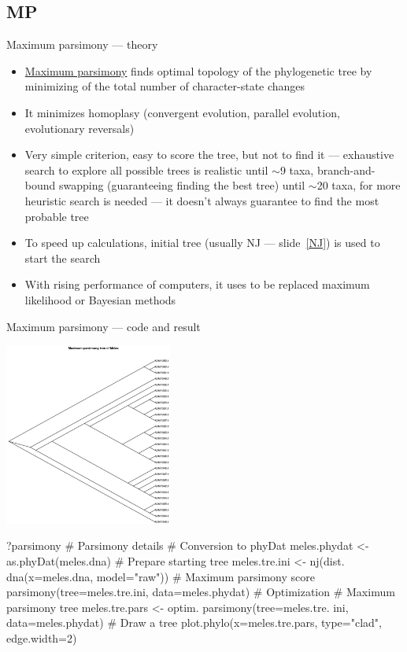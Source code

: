 \documentclass[compress, ucs, xelatex, 11pt, xcolor=svgnames,
  hyperref={
    bookmarks=true,
    unicode=true,
    colorlinks=true,
    pdftitle={Molecular data in R},
    plainpages=false,
    pdfauthor={Vojtech Zeisek},
    pdfsubject={Course about phylogeny and evolution in R},
    pdfcreator={XeLaTeX},
    pdfkeywords={R, evolution, phylogeny, molecular data},
    linkcolor=Tomato,
    anchorcolor=SaddleBrown,
    citecolor=Goldenrod,
    filecolor=DarkMagenta,
    menucolor=Sienna,
    urlcolor=DarkTurquoise,
    pdftex},
  url={hyphens, lowtilde} %
  ]{beamer}
\begin{document}
\subsection{MP}

\begin{frame}{Maximum parsimony --- theory}
  \label{MP}
  \begin{itemize}
    \item \href{https://en.wikipedia.org/wiki/Maximum_parsimony_(phylogenetics)}{Maximum parsimony} finds optimal topology of the phylogenetic tree by minimizing of the total number of character-state changes
    \item It minimizes homoplasy (convergent evolution, parallel evolution, evolutionary reversals)
    \item Very simple criterion, easy to score the tree, but not to find it --- exhaustive search to explore all possible trees is realistic until $\sim$9 taxa, branch-and-bound swapping (guaranteeing finding the best tree) until $\sim$20 taxa, for more heuristic search is needed --- it doesn't always guarantee to find the most probable tree
    \item To speed up calculations, initial tree (usually NJ --- slide~\ref{NJ}) is used to start the search
    \item With rising performance of computers, it uses to be replaced maximum likelihood or Bayesian methods
  \end{itemize}
\end{frame}

\begin{frame}[fragile]{Maximum parsimony --- code and result}
\begin{multicols}{2}
  \vfil
  \includegraphics[height=6cm]{parsimony.png}
  \vfil
  \begin{spluscode}
    ?parsimony # Parsimony details
    # Conversion to phyDat
    meles.phydat <-
      as.phyDat(meles.dna)
    # Prepare starting tree
    meles.tre.ini <- nj(dist.
      dna(x=meles.dna, model="raw"))
    # Maximum parsimony score
    parsimony(tree=meles.tre.ini,
      data=meles.phydat)
    # Optimization
    # Maximum parsimony tree
    meles.tre.pars <- optim.
      parsimony(tree=meles.tre.
      ini, data=meles.phydat)
    # Draw a tree
    plot.phylo(x=meles.tre.pars,
      type="clad", edge.width=2)
  \end{spluscode}
\end{multicols}
\end{frame}
\end{document}
